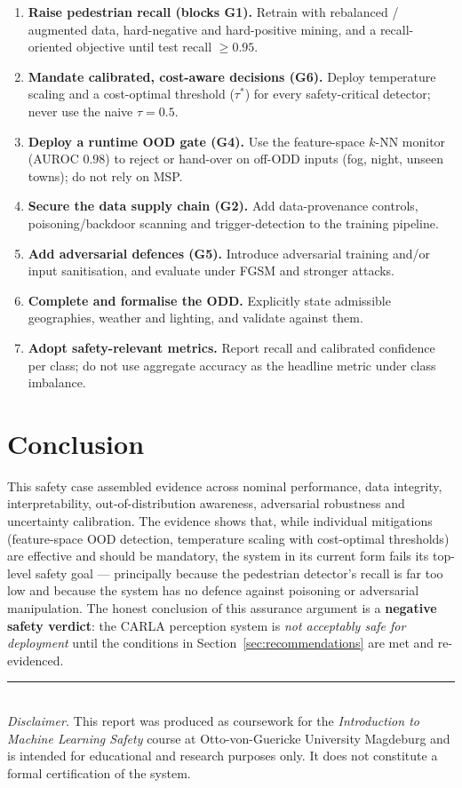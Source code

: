 \documentclass[11pt,a4paper]{article}
\begin{document}
\begin{enumerate}[leftmargin=1.6em,itemsep=2pt]
  \item \textbf{Raise pedestrian recall (blocks G1).} Retrain with rebalanced /
        augmented data, hard-negative and hard-positive mining, and a
        recall-oriented objective until test recall $\ge 0.95$.
  \item \textbf{Mandate calibrated, cost-aware decisions (G6).} Deploy
        temperature scaling and a cost-optimal threshold ($\tau^{\ast}$) for every
        safety-critical detector; never use the naive $\tau=0.5$.
  \item \textbf{Deploy a runtime OOD gate (G4).} Use the feature-space $k$-NN
        monitor (AUROC $0.98$) to reject or hand-over on off-ODD inputs (fog,
        night, unseen towns); do not rely on MSP.
  \item \textbf{Secure the data supply chain (G2).} Add data-provenance controls,
        poisoning/backdoor scanning and trigger-detection to the training pipeline.
  \item \textbf{Add adversarial defences (G5).} Introduce adversarial training
        and/or input sanitisation, and evaluate under FGSM and stronger attacks.
  \item \textbf{Complete and formalise the ODD.} Explicitly state admissible
        geographies, weather and lighting, and validate against them.
  \item \textbf{Adopt safety-relevant metrics.} Report recall and calibrated
        confidence per class; do not use aggregate accuracy as the headline
        metric under class imbalance.
\end{enumerate}

\section{Conclusion}
This safety case assembled evidence across nominal performance, data integrity,
interpretability, out-of-distribution awareness, adversarial robustness and
uncertainty calibration. The evidence shows that, while individual mitigations
(feature-space OOD detection, temperature scaling with cost-optimal thresholds)
are effective and should be mandatory, the system in its current form fails its
top-level safety goal --- principally because the pedestrian detector's recall is
far too low and because the system has no defence against poisoning or
adversarial manipulation. The honest conclusion of this assurance argument is a
\textbf{negative safety verdict}: the CARLA perception system is
\emph{not acceptably safe for deployment} until the conditions in
Section~\ref{sec:recommendations} are met and re-evidenced.

\vspace{0.8cm}
\noindent\rule{\linewidth}{0.4pt}\\
{\small \textit{Disclaimer.} This report was produced as coursework for the
\emph{Introduction to Machine Learning Safety} course at Otto-von-Guericke
University Magdeburg and is intended for educational and research purposes only.
It does not constitute a formal certification of the system.}
\end{document}
